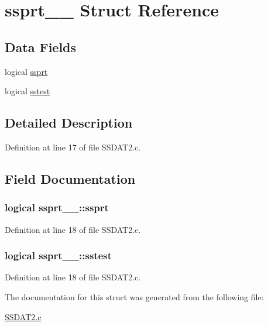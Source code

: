 \hypertarget{structssprt__1__}{}\section{ssprt\+\_\+\_\+ Struct Reference}
\label{structssprt__1__}
\subsection*{Data Fields}
\begin{DoxyCompactItemize}
\item 
logical \hyperlink{structssprt__1___a2e12f1b01aa6841847173bf2970be0b4}{ssprt}
\item 
logical \hyperlink{structssprt__1___ac6d7388dd3e96e343b9a419855149856}{sstest}
\end{DoxyCompactItemize}


\subsection{Detailed Description}


Definition at line 17 of file S\+S\+D\+A\+T2.\+c.



\subsection{Field Documentation}
\subsubsection[{\texorpdfstring{ssprt}{ssprt}}]{\setlength{\rightskip}{0pt plus 5cm}logical ssprt\+\_\+\_\+\+::ssprt}\hypertarget{structssprt__1___a2e12f1b01aa6841847173bf2970be0b4}{}\label{structssprt__1___a2e12f1b01aa6841847173bf2970be0b4}


Definition at line 18 of file S\+S\+D\+A\+T2.\+c.

\subsubsection[{\texorpdfstring{sstest}{sstest}}]{\setlength{\rightskip}{0pt plus 5cm}logical ssprt\+\_\+\_\+\+::sstest}\hypertarget{structssprt__1___ac6d7388dd3e96e343b9a419855149856}{}\label{structssprt__1___ac6d7388dd3e96e343b9a419855149856}


Definition at line 18 of file S\+S\+D\+A\+T2.\+c.



The documentation for this struct was generated from the following file\+:\begin{DoxyCompactItemize}
\item 
\hyperlink{SSDAT2_8c}{S\+S\+D\+A\+T2.\+c}\end{DoxyCompactItemize}
